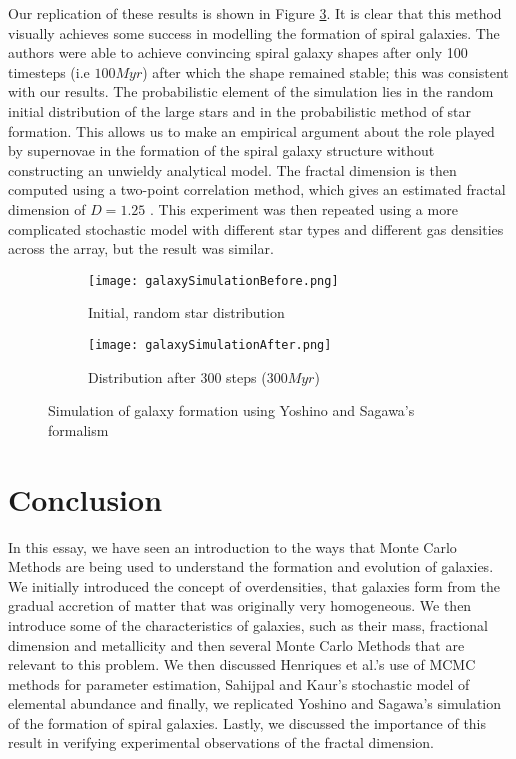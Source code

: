 \documentclass[amsmath,amssymb,reprint,
tightenlines,aps,prl,11pt]{revtex4-1}
\begin{document}
Our replication of these results is shown in Figure \ref{fig:beforeAfter}. It is clear that this method visually achieves some success in modelling the formation of spiral galaxies. The authors were able to achieve convincing spiral galaxy shapes after only 100 timesteps (i.e $100 Myr$) after which the shape remained stable; this was consistent with our results. The probabilistic element of the simulation lies in the random initial distribution of the large stars and in the probabilistic method of star formation. This allows us to make an empirical argument about the role played by supernovae in the formation of the spiral galaxy structure without constructing an unwieldy analytical model. The fractal dimension is then computed using a two-point correlation method, which gives an estimated fractal dimension of $D = 1.25$ \cite{yoshinoMONTECARLOSIMULATION2008}. This experiment was then repeated using a more complicated stochastic model with different star types and different gas densities across the array, but the result was similar.

\begin{figure}[]
        \centering
        \begin{subfigure}[]{0.9\columnwidth}
            \centering
            \texttt{[image: galaxySimulationBefore.png]}
            \caption{Initial, random star distribution}
            \label{fig:before}
        \end{subfigure}
        \hfill
        \begin{subfigure}[]{\columnwidth}
            \centering
            \texttt{[image: galaxySimulationAfter.png]}
            \caption{Distribution after 300 steps ($300 Myr$)}
            \label{fig:after}
        \end{subfigure}
   \caption{Simulation of galaxy formation using Yoshino and Sagawa's formalism}
   \label{fig:beforeAfter}
   \end{figure}  

\section{Conclusion}

In this essay, we have seen an introduction to the ways that Monte Carlo Methods are being used to understand the formation and evolution of galaxies. We initially introduced the concept of overdensities, that galaxies form from the gradual accretion of matter that was originally very homogeneous. We then introduce some of the characteristics of galaxies, such as their mass, fractional dimension and metallicity and then several Monte Carlo Methods that are relevant to this problem. We then discussed Henriques et al.'s use of MCMC methods for parameter estimation, Sahijpal and Kaur's stochastic model of elemental abundance and finally, we replicated Yoshino and Sagawa's simulation of the formation of spiral galaxies. Lastly, we discussed the importance of this result in verifying experimental observations of the fractal dimension.
\end{document}
